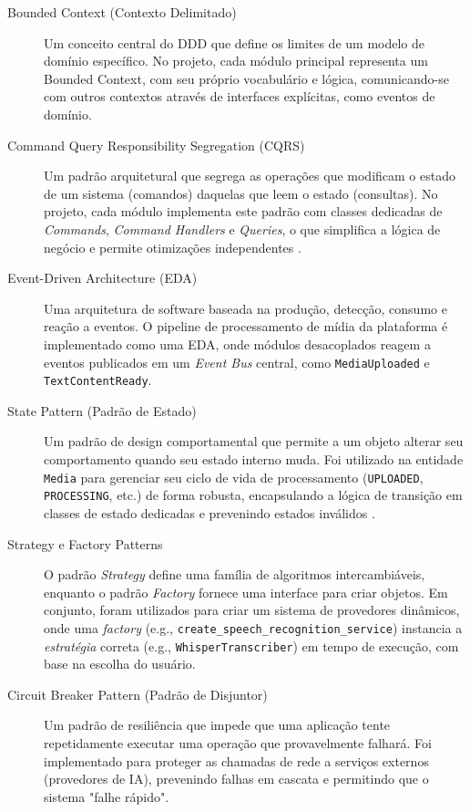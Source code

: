 \begin{description}
    \item[Bounded Context (Contexto Delimitado)] Um conceito central do DDD que define os limites de um modelo de domínio específico. No projeto, cada módulo principal representa um Bounded Context, com seu próprio vocabulário e lógica, comunicando-se com outros contextos através de interfaces explícitas, como eventos de domínio.

    \item[Command Query Responsibility Segregation (CQRS)] Um padrão arquitetural que segrega as operações que modificam o estado de um sistema (comandos) daquelas que leem o estado (consultas). No projeto, cada módulo implementa este padrão com classes dedicadas de \textit{Commands}, \textit{Command Handlers} e \textit{Queries}, o que simplifica a lógica de negócio e permite otimizações independentes \cite{young2010cqrs}.

    \item[Event-Driven Architecture (EDA)] Uma arquitetura de software baseada na produção, detecção, consumo e reação a eventos. O pipeline de processamento de mídia da plataforma é implementado como uma EDA, onde módulos desacoplados reagem a eventos publicados em um \textit{Event Bus} central, como \texttt{MediaUploaded} e \texttt{TextContentReady}.

    \item[State Pattern (Padrão de Estado)] Um padrão de design comportamental que permite a um objeto alterar seu comportamento quando seu estado interno muda. Foi utilizado na entidade \texttt{Media} para gerenciar seu ciclo de vida de processamento (\texttt{UPLOADED}, \texttt{PROCESSING}, etc.) de forma robusta, encapsulando a lógica de transição em classes de estado dedicadas e prevenindo estados inválidos \cite{gamma1995design}.

    \item[Strategy e Factory Patterns] O padrão \textit{Strategy} define uma família de algoritmos intercambiáveis, enquanto o padrão \textit{Factory} fornece uma interface para criar objetos. Em conjunto, foram utilizados para criar um sistema de provedores dinâmicos, onde uma \textit{factory} (e.g., \texttt{create\_speech\_recognition\_service}) instancia a \textit{estratégia} correta (e.g., \texttt{WhisperTranscriber}) em tempo de execução, com base na escolha do usuário.

    \item[Circuit Breaker Pattern (Padrão de Disjuntor)] Um padrão de resiliência que impede que uma aplicação tente repetidamente executar uma operação que provavelmente falhará. Foi implementado para proteger as chamadas de rede a serviços externos (provedores de IA), prevenindo falhas em cascata e permitindo que o sistema "falhe rápido".


\end{description}
